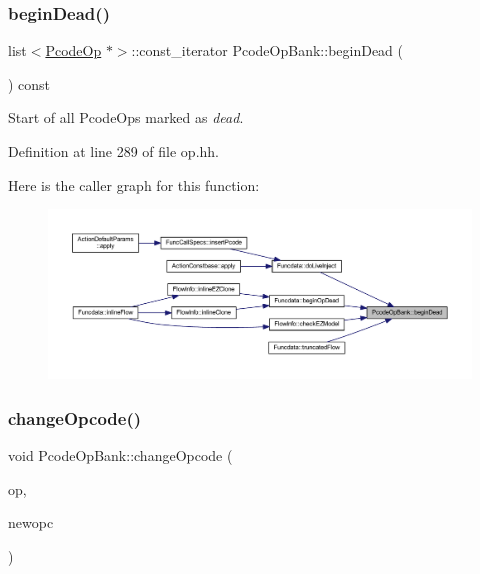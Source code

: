 \subsubsection{\texorpdfstring{beginDead()}{beginDead()}}
{\footnotesize\ttfamily list$<$\mbox{\hyperlink{class_pcode_op}{Pcode\+Op}} $\ast$$>$\+::const\+\_\+iterator Pcode\+Op\+Bank\+::begin\+Dead (\begin{DoxyParamCaption}\item[{void}]{ }\end{DoxyParamCaption}) const\hspace{0.3cm}{\ttfamily [inline]}}



Start of all Pcode\+Ops marked as {\itshape dead}. 



Definition at line 289 of file op.\+hh.

Here is the caller graph for this function\+:
\nopagebreak
\begin{figure}[H]
\begin{center}
\leavevmode
\includegraphics[width=350pt]{class_pcode_op_bank_a11c4847402571c3bc56dce8adb4df2ea_icgraph}
\end{center}
\end{figure}
\mbox{\label{class_pcode_op_bank_a66328024453859527245d5143755adc6}} 
\subsubsection{\texorpdfstring{changeOpcode()}{changeOpcode()}}
{\footnotesize\ttfamily void Pcode\+Op\+Bank\+::change\+Opcode (\begin{DoxyParamCaption}\item[{\mbox{\hyperlink{class_pcode_op}{Pcode\+Op}} $\ast$}]{op,  }\item[{\mbox{\hyperlink{class_type_op}{Type\+Op}} $\ast$}]{newopc }\end{DoxyParamCaption})}



